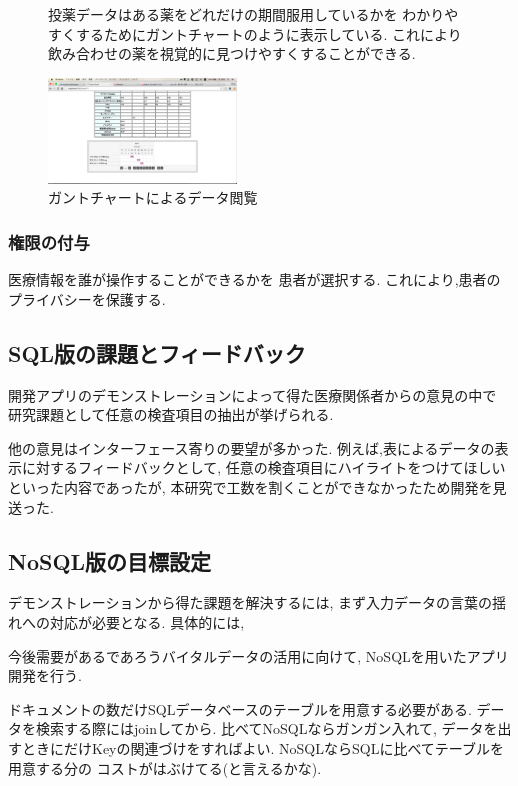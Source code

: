     \begin{figure}[htbp]

      投薬データはある薬をどれだけの期間服用しているかを
      わかりやすくするためにガントチャートのように表示している.
      これにより飲み合わせの薬を視覚的に見つけやすくすることができる.

      \begin{center}
        \includegraphics[width=5cm, bb=0 0 645 790]{./gazou/DjangoGantt.png} %
      \end{center}
      \caption{ガントチャートによるデータ閲覧}
      \label{DjangoGantt}
    \end{figure}

  \subsubsection{権限の付与}
    医療情報を誰が操作することができるかを
    患者が選択する.
    これにより,患者のプライバシーを保護する.


\subsection{SQL版の課題とフィードバック}

  開発アプリのデモンストレーションによって得た医療関係者からの意見の中で
  研究課題として任意の検査項目の抽出が挙げられる.

  他の意見はインターフェース寄りの要望が多かった.
  例えば,表によるデータの表示に対するフィードバックとして,
  任意の検査項目にハイライトをつけてほしいといった内容であったが,
  本研究で工数を割くことができなかったため開発を見送った.


\subsection{NoSQL版の目標設定}
  デモンストレーションから得た課題を解決するには,
  まず入力データの言葉の揺れへの対応が必要となる.
  具体的には,

  今後需要があるであろうバイタルデータの活用に向けて,
  NoSQLを用いたアプリ開発を行う.

  ドキュメントの数だけSQLデータベースのテーブルを用意する必要がある.
  データを検索する際にはjoinしてから.
  比べてNoSQLならガンガン入れて,
  データを出すときにだけKeyの関連づけをすればよい.
  NoSQLならSQLに比べてテーブルを用意する分の
  コストがはぶけてる(と言えるかな).
  \fi
